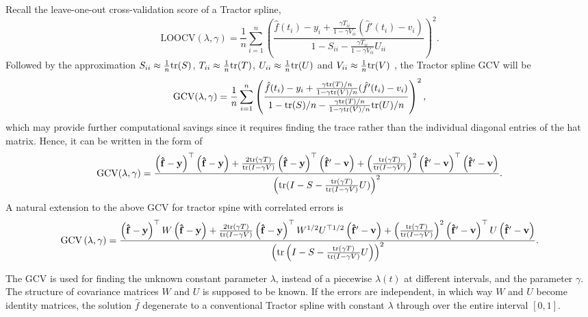 Recall the leave-one-out cross-validation score of a Tractor spline, 
\begin{equation*}
\mbox{LOOCV}(\lambda,\gamma)=\frac{1}{n}\sum_{i=1}^{n}\left( \frac{\hat{f}(t_i)-y_i+\frac{\gamma T_{ii}}{1-\gamma V_{ii}}(\hat{f}'(t_i)-v_i)}{1-S_{ii}-\frac{\gamma T_{ii}}{1-\gamma V_{ii}}U_{ii}} \right)^2.
\end{equation*}
Followed by the approximation $S_{ii}\approx\frac{1}{n}\mathrm{tr}(S)$, $T_{ii}\approx\frac{1}{n}\mathrm{tr}(T)$, $U_{ii}\approx\frac{1}{n}\mathrm{tr}(U)$ and $V_{ii}\approx\frac{1}{n}\mathrm{tr}(V)$ \cite{syed2011review}, the Tractor spline GCV will be 
\begin{equation*}
\mbox{GCV}(\lambda,\gamma)=\frac{1}{n}\sum_{i=1}^{n}\left( \frac{\hat{f}(t_i)-y_i+ \frac{\gamma\mathrm{tr}(T)/n}{1-\gamma \mathrm{tr}(V)/n}(\hat{f}'(t_i)-v_i)}{1-\mathrm{tr}(S)/n-\frac{\gamma\mathrm{tr}(T)/n}{1-\gamma \mathrm{tr}(V)/n} \mathrm{tr}(U)/n} \right)^2,
\end{equation*}
which may provide further computational savings since it requires finding the trace rather than the individual diagonal entries of the hat matrix. Hence, it can be written in the form of \footnotesize
\begin{equation*}
\mbox{GCV}(\lambda,\gamma)=\frac{\left(\mathbf{\hat{f}}-\mathbf{y}\right)^\top \left(\mathbf{\hat{f}}-\mathbf{y}\right) + \frac{2\mathrm{tr}\left(\gamma T\right)}{\mathrm{tr}\left(I-\gamma V\right)}\left(\mathbf{\hat{f}}-\mathbf{y}\right)^\top \left(\mathbf{\hat{f}}'-\mathbf{v}\right) + \left( \frac{\mathrm{tr}(\gamma T)}{\mathrm{tr}(I-\gamma V)} \right)^2 \left(\mathbf{\hat{f}}'-\mathbf{v}\right)^\top \left(\mathbf{\hat{f}}'-\mathbf{v}\right)}{\left( \mathrm{tr}(I-S-\frac{\mathrm{tr}(\gamma T)}{\mathrm{tr}(I-\gamma V)}U) \right)^2}.
\end{equation*} \normalsize
A natural extension to the above GCV for tractor spine with correlated errors is \scriptsize
\begin{equation}
\mbox{GCV}\left(\lambda,\gamma\right)=\frac{\left(\mathbf{\hat{f}}-\mathbf{y}\right)^\top W\left(\mathbf{\hat{f}}-\mathbf{y}\right)+\frac{2\mathrm{tr}\left(\gamma T\right)}{\mathrm{tr}\left(I-\gamma V\right)}\left(\mathbf{\hat{f}}-\mathbf{y}\right)^\top W^{1/2}U^{\top 1/2}\left(\mathbf{\hat{f}}'-\mathbf{v}\right) + \left( \frac{\mathrm{tr}\left(\gamma T\right)}{\mathrm{tr}\left(I-\gamma V\right)} \right)^2 \left(\mathbf{\hat{f}}'-\mathbf{v}\right)^\top U\left(\mathbf{\hat{f}}'-\mathbf{v}\right)}{\left( \mathrm{tr}\left(I-S-\frac{\mathrm{tr}\left(\gamma T\right)}{\mathrm{tr}\left(I-\gamma V\right)}U\right) \right)^2}.
\end{equation}
\normalsize


The GCV is used for finding the unknown constant parameter $\lambda$, instead of a piecewise $\lambda(t)$ at different intervals, and the parameter $\gamma$. The structure of covariance matrices $W$ and $U$ is supposed to be known. If the errors are independent, in which way $W$ and $U$ become identity matrices, the solution $\hat{f}$ degenerate to a conventional Tractor spline with constant $\lambda$ through over the entire interval $[0,1]$.  


